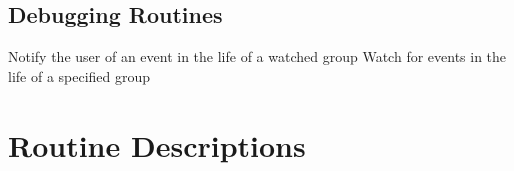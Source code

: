 \subsection{\label{SEC:ADAM}Debugging Routines}

            { Notify the user of an event in the life of a watched group}
            { Watch for events in the life of a specified group}

\newpage
\section{\label{APP:SPEC}Routine Descriptions}

\small

